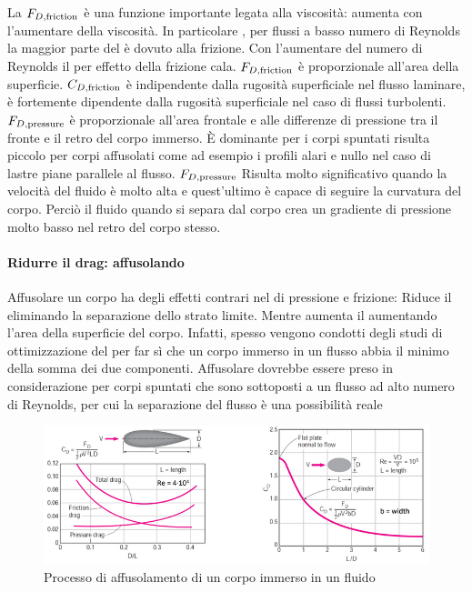 La $F_{D,\textup{friction}}$ è una funzione importante legata alla viscosità: aumenta con l'aumentare della viscosità. In particolare , per flussi a basso numero di Reynolds la maggior parte del  è dovuto alla frizione.
Con l'aumentare del numero di Reynolds il  per effetto della frizione cala.
$F_{D,\textup{friction}}$ è proporzionale all'area della superficie. 
$C_{D,\textup{friction}}$ è indipendente dalla rugosità superficiale nel flusso laminare, è fortemente dipendente dalla rugosità superficiale nel caso di flussi turbolenti.
$F_{D,\textup{pressure}}$ è proporzionale all'area frontale e alle differenze di pressione tra il fronte e il retro del corpo immerso. È dominante per i corpi spuntati risulta piccolo per corpi affusolati come ad esempio i profili alari e nullo nel caso di lastre piane parallele al flusso.
$F_{D,\textup{pressure}}$ Risulta molto significativo quando la velocità del fluido è molto alta e quest'ultimo è capace di seguire la curvatura del corpo. Perciò il fluido quando si separa dal corpo crea un gradiente di pressione molto basso nel retro del corpo stesso.

\paragraph{Ridurre il drag: affusolando}
Affusolare un corpo ha degli effetti contrari nel  di pressione e frizione: Riduce il  eliminando la separazione dello strato limite. Mentre aumenta il  aumentando l'area della superficie del corpo.
Infatti, spesso vengono condotti degli studi di ottimizzazione del  per far sì che un corpo immerso in un flusso abbia il minimo della somma dei due componenti.
Affusolare dovrebbe essere preso in considerazione per corpi spuntati che sono sottoposti a un flusso ad alto numero di Reynolds, per cui la separazione del flusso è una possibilità reale 

\begin{figure}
\centering
\includegraphics[width = \textwidth]{gfx/Affusolamento}
\caption{Processo di affusolamento di un corpo immerso in un fluido}
\label{fig:Affusolamento}
\end{figure}

